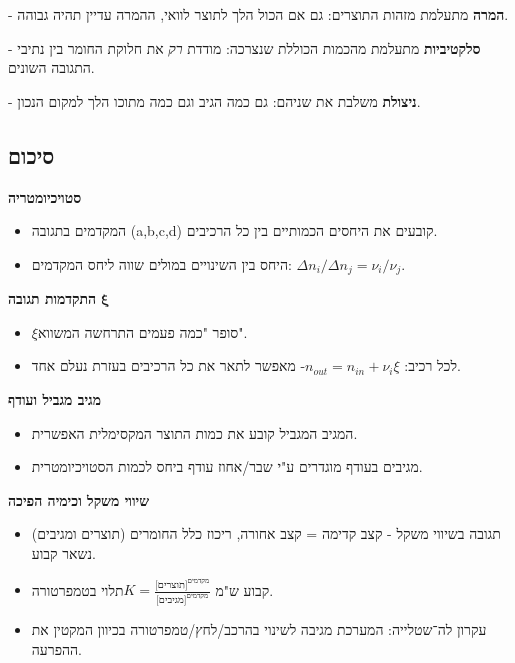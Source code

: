 \documentclass[
  hebrew,
  letterpaper,
  DIV=11,
  numbers=noendperiod]{scrreprt}
\begin{document}
- \textbf{המרה} מתעלמת מזהות התוצרים: גם אם הכול הלך לתוצר לוואי, ההמרה
עדיין תהיה גבוהה.

- \textbf{סלקטיביות} מתעלמת מהכמות הכוללת שנצרכה: מודדת \emph{רק} את
חלוקת החומר בין נתיבי התגובה השונים.

- \textbf{ניצולת} משלבת את שניהם: גם כמה הגיב וגם כמה מתוכו הלך למקום
הנכון.

\subsection{סיכום}\label{ux5e1ux5d9ux5dbux5d5ux5dd-9}

\textbf{סטויכיומטריה}

\begin{itemize}
\item
  המקדמים בתגובה (a,b,c,d) קובעים את היחסים הכמותיים בין כל הרכיבים.
\item
  היחס בין השינויים במולים שווה ליחס המקדמים:
  \(\Delta n_{i}/\Delta n_{j} = \nu_{i}/\nu_{j}\).
\end{itemize}

\textbf{התקדמות תגובה} \(\mathbf{\xi}\)

\begin{itemize}
\item
  \(\xi\)סופר "כמה פעמים התרחשה המשווא".
\item
  לכל רכיב: \(n_{out} = n_{in} + \nu_{i}\xi\)- מאפשר לתאר את כל הרכיבים
  בעזרת נעלם אחד.
\end{itemize}

\textbf{מגיב מגביל ועודף}

\begin{itemize}
\item
  המגיב המגביל קובע את כמות התוצר המקסימלית האפשרית.
\item
  מגיבים בעודף מוגדרים ע"י שבר/אחוז עודף ביחס לכמות הסטויכיומטרית.
\end{itemize}

\textbf{שיווי משקל וכימיה הפיכה}

\begin{itemize}
\item
  תגובה בשיווי משקל - קצב קדימה = קצב אחורה, ריכוז כלל החומרים (תוצרים
  ומגיבים) נשאר קבוע.
\item
  קבוע ש"מ
  \(K = \frac{\lbrack\text{תוצרים}\rbrack^{\text{מקדמים}}}{\lbrack\text{מגיבים}\rbrack^{\text{מקדמים}}}\)תלוי
  בטמפרטורה.
\item
  עקרון לה־שטלייה: המערכת מגיבה לשינוי בהרכב/לחץ/טמפרטורה בכיוון המקטין
  את ההפרעה.
\end{itemize}
\end{document}
